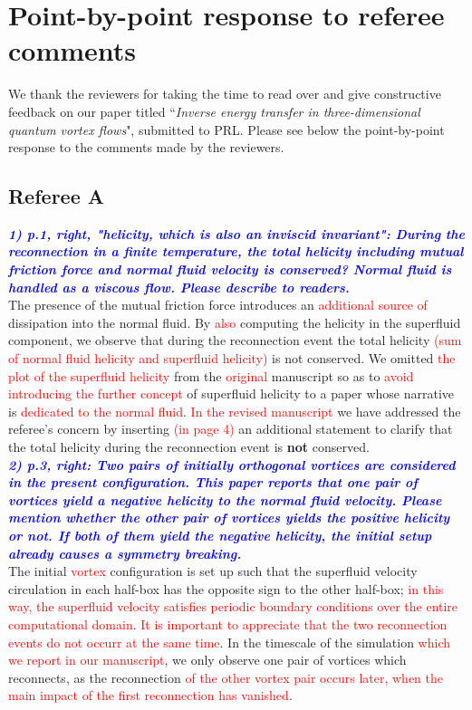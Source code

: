 \documentclass[a4paper,10pt]{article}
\def\red#1{\textcolor{red}{#1}}
\def\blue#1{\textcolor{blue}{#1}}
\def\refcomment#1{\textbf{\blue{\emph{#1}}}\\}
\begin{document}
\section*{\centering Point-by-point response to referee comments}

We thank the reviewers for taking the time to read over and give constructive feedback on our paper titled “\emph{Inverse energy transfer in three-dimensional quantum vortex flows}", submitted to PRL. Please see below the point-by-point response to the comments made by the reviewers.

\subsection*{Referee A}


    \refcomment{1) p.1, right, "helicity, which is also an inviscid invariant": During
    the reconnection in a finite temperature, the total helicity including
    mutual friction force and normal fluid velocity is conserved? Normal
    fluid is handled as a viscous flow. Please describe to readers.}

    The presence of the mutual friction force introduces an \red{additional source of} dissipation into the normal fluid. By \red{also} computing the helicity in the superfluid component, we observe that during the reconnection event
the total helicity \red{(sum of normal fluid helicity and superfluid helicity)} is not conserved. We omitted \red{the plot of the superfluid helicity}
from the \red{original} manuscript so as to \red{avoid introducing}
\red{the further concept} 
of superfluid helicity to a paper whose narrative is \red{dedicated to the
normal fluid}. \red{In the revised manuscript} we have addressed the 
referee's concern by inserting \red{(in page 4)} an additional statement 
to clarify that the total helicity during the reconnection event is 
\textbf{not} conserved. \\

    \refcomment{2) p.3, right: Two pairs of initially orthogonal vortices are
    considered in the present configuration. This paper reports that one
    pair of vortices yield a negative helicity to the normal fluid
    velocity. Please mention whether the other pair of vortices yields the
    positive helicity or not. If both of them yield the negative helicity,
    the initial setup already causes a symmetry breaking.}

    The initial \red{vortex} configuration is set up such that the 
superfluid velocity circulation in each half-box has the opposite sign to 
the other half-box; \red{in this way, the superfluid velocity satisfies
periodic boundary conditions over the entire computational 
domain}.
\red{It is important to appreciate that the two reconnection events do
not occurr at the same time}. 
In the timescale of the simulation \red{which we report in our manuscript}, 
we only observe one pair of vortices which reconnects, as the reconnection 
\red{of the other vortex pair occurs later, when the main impact of the first
reconnection has vanished}.
\end{document}
